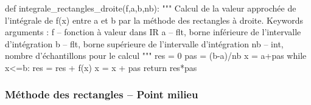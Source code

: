 \documentclass[10pt]{article}
\begin{document}
\begin{py}
\begin{python}
def integrale_rectangles_droite(f,a,b,nb):
    """
    Calcul de la valeur approchée de l'intégrale de f(x) entre a et b par la 
    méthode des rectangles à droite.
    Keywords arguments :
    f -- fonction à valeur dans IR
    a -- flt, borne inférieure de l'intervalle d'intégration
    b -- flt, borne supérieure de l'intervalle d'intégration
    nb -- int, nombre d'échantillons pour le calcul
    """
    res = 0
    pas = (b-a)/nb
    x = a+pas
    while x<=b:
        res = res + f(x)
        x = x + pas
    return res*pas
\end{python}
\end{py}

\subsubsection{Méthode des rectangles -- Point milieu}
\end{document}

